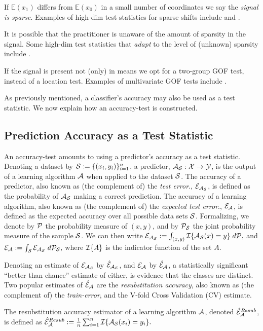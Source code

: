 \documentclass[]{bio}
\begin{document}
If $\mathbb{E}(x_1)$ differs from $\mathbb{E}(x_0)$ in a small number of coordinates we say the \emph{signal is sparse}.
Examples of high-dim test statistics for sparse shifts include \cite{cai_two-sample_2013} and \cite{chang2014simulation}.

It is possible that the practitioner is unaware of the amount of sparsity in the signal. 
Some high-dim test statistics that \emph{adapt} to the level of (unknown) sparsity include \cite{simes1986improved,donoho2004higher,zhong2013tests,shen2015adaptive,moscovich2016exact}.

If the signal is present not (only) in means we opt for a two-group GOF test, instead of a location test. 
Examples of multivariate GOF tests include \cite{bickel1969distribution,friedman1979multivariate,hall2002permutation,szekely2004testing,Biau2005,Rosenbaum2005,eric2008testing,perez2009estimation,vayatis_auc_2009,gretton_kernel_2012-1}.

As previously mentioned, a classifier's accuracy may also be used as a test statistic. 
We now explain how an accuracy-test is constructed. 


\subsection{Prediction Accuracy as a Test Statistic}
An accuracy-test amounts to using a predictor's accuracy as a test statistic.  
Denoting a dataset by $\mathcal{S}:=\{(x_i,y_i)\}_{i=1}^n$, a predictor, $\mathcal{A}_{\mathcal{S}}:\mathcal{X} \to \mathcal{Y}$, is the output of a learning algorithm $\mathcal{A}$ when applied to the dataset $\mathcal{S}$. 
The accuracy of a predictor, also known as (the complement of) the \emph{test error}., $\mathcal{E}_{\mathcal{A}_{\mathcal{S}}}$, is defined as the probability of $\mathcal{A}_{\mathcal{S}}$ making a correct prediction. 
The accuracy of a learning algorithm, also known  as (the complement of) the \emph{expected test error}., $\mathcal{E}_{\mathcal{A}}$, is defined as the expected accuracy over all possible data sets $\mathcal{S}$. 
Formalizing, we denote by $\mathcal{P}$ the probability measure of $(x, y)$, and by $\mathcal{P}_{\mathcal{S}}$ the joint probability measure of the sample $\mathcal{S}$. 
We can then write $\mathcal{E}_{\mathcal{A}_{\mathcal{S}}}:=\int_{(x,y)} \mathcal{I}{\{ \mathcal{A}_{\mathcal{S}}(x)=y \}} \; d\mathcal{P},$
and
$\mathcal{E}_{\mathcal{A}}:=\int_{\mathcal{S}} \mathcal{E}_{\mathcal{A}_{\mathcal{S}}} \; d\mathcal{P}_{\mathcal{S}},$
where $\mathcal{I}{\{ A \}}$ is the indicator function of the set $A$. 

Denoting an estimate of $\mathcal{E}_{\mathcal{A}_{\mathcal{S}}}$ by $\hat{\mathcal{E}}_{\mathcal{A}_{\mathcal{S}}}$, and $\mathcal{E}_{\mathcal{A}}$ by $\hat{\mathcal{E}}_{\mathcal{A}}$, a statistically significant ``better than chance'' estimate of either, is evidence that the classes are distinct. 
Two popular estimates of $\hat{\mathcal{E}}_{\mathcal{A}}$ are the \emph{resubstitution accuracy}, also known as (the complement of) the \emph{train-error}, and the V-fold Cross Validation (CV) estimate.
\begin{definition}
	\label{def:resubstitution}
	The resubstitution accuracy estimator of a learning algorithm $\mathcal{A}$, denoted $\hat{\mathcal{E}}_{\mathcal{A}}^{Resub}$,  is defined as
	$\hat{\mathcal{E}}_{\mathcal{A}}^{Resub} := \frac 1n \sum_{i=1}^{n} \mathcal{I}{\{ \mathcal{A}_{\mathcal{S}}(x_i)=y_i \}}.$
\end{definition}
\end{document}
